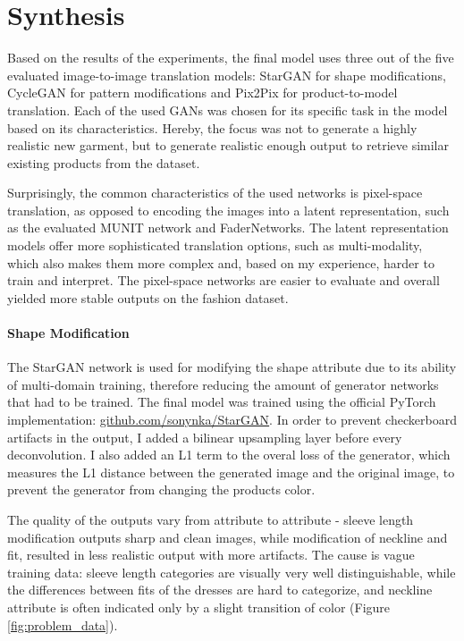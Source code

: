 \documentclass[12pt]{report}
\begin{document}
\section{Synthesis}
Based on the results of the experiments, the final model uses three out of the five evaluated image-to-image translation models: StarGAN for shape modifications, CycleGAN for pattern modifications and Pix2Pix for product-to-model translation. Each of the used GANs was chosen for its specific task in the model based on its characteristics. Hereby, the focus was not to generate a highly realistic new garment, but to generate realistic enough output to retrieve similar existing products from the dataset.

Surprisingly, the common characteristics of the used networks is pixel-space translation, as opposed to encoding the images into a latent representation, such as the evaluated MUNIT network and FaderNetworks. The latent representation models offer more sophisticated translation options, such as multi-modality, which also makes them more complex and, based on my experience, harder to train and interpret. The pixel-space networks are easier to evaluate and overall yielded more stable outputs on the fashion dataset.

\paragraph{Shape Modification}
The StarGAN network is used for modifying the shape attribute due to its ability of multi-domain training, therefore reducing the amount of generator networks that had to be trained. The final model was trained using the official PyTorch implementation: \hyperlink{https://github.com/sonynka/StarGAN}{github.com/sonynka/StarGAN}. In order to prevent checkerboard artifacts in the output, I added a bilinear upsampling layer before every deconvolution. I also added an L1 term to the overal loss of the generator, which measures the L1 distance between the generated image and the original image, to prevent the generator from changing the products color.

The quality of the outputs vary from attribute to attribute - sleeve length modification outputs sharp and clean images, while modification of neckline and fit, resulted in less realistic output with more artifacts. The cause is vague training data: sleeve length categories are visually very well distinguishable, while the differences between fits of the dresses are hard to categorize, and neckline attribute is often indicated only by a slight transition of color (Figure \ref{fig:problem_data}).
\end{document}
